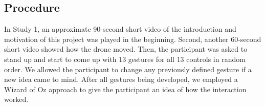\documentclass{sigchi}
\begin{document}



\subsection{Procedure}

In Study 1, an approximate 90-second short video of the introduction and motivation of this project was played in the beginning. Second, another 60-second short video showed how the drone moved. Then, the participant was asked to stand up and start to come up with 13 gestures for all 13 controls in random order. We allowed the participant to change any previously defined gesture if a new idea came to mind. After all gestures being developed, we employed a Wizard of Oz approach to give the participant an idea of how the interaction worked.
\end{document}
